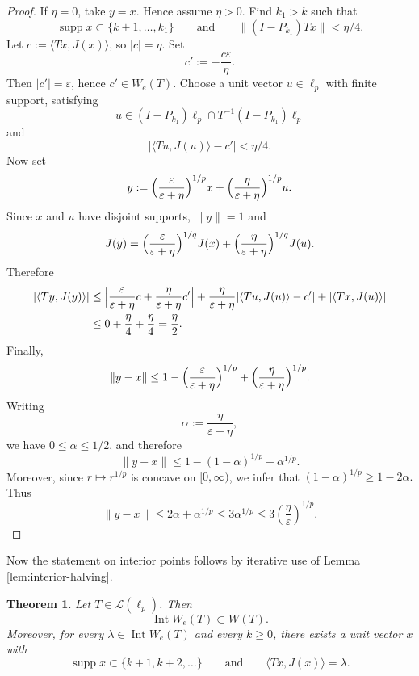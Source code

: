 \documentclass[11pt]{amsart}
\numberwithin{equation}{section}
\newtheorem{theorem}{Theorem}[section]
\theoremstyle{definition}
\theoremstyle{remark}
\DeclareMathOperator{\Int}{Int}
\DeclareMathOperator{\supp}{supp}
\newcommand{\ip}[2]{\langle #1,#2\rangle}
\newcommand{\We}{W_e}
\begin{document}
\begin{proof}
If \(\eta=0\), take \(y=x\). Hence assume \(\eta>0\).
Find $k_1>k$ such that
\[
\supp x\subset \{k+1,\dots,k_1\}
\qquad\text{and}\qquad
\|(I-P_{k_1})Tx\|<\eta/4.
\]
Let $c:=\ip{Tx}{J(x)}$, so $|c|=\eta$. Set
\[
c':=-\frac{c\varepsilon}{\eta}.
\]
Then $|c'|=\varepsilon$, hence $c'\in \We(T)$.
Choose a unit vector $u\in \ell_p$ with finite support, satisfying
\[
u\in (I-P_{k_1})\ell_p\cap T^{-1}(I-P_{k_1})\ell_p
\]
and
\[
|\ip{Tu}{J(u)}-c'|<\eta/4.
\]
Now set
\[
y:=\Bigl(\frac{\varepsilon}{\varepsilon+\eta}\Bigr)^{1/p}x+
\Bigl(\frac{\eta}{\varepsilon+\eta}\Bigr)^{1/p}u.
\]
Since $x$ and $u$ have disjoint supports, $\|y\|=1$ and
\[
J(y)=\Bigl(\frac{\varepsilon}{\varepsilon+\eta}\Bigr)^{1/q}J(x)+
\Bigl(\frac{\eta}{\varepsilon+\eta}\Bigr)^{1/q}J(u).
\]
Therefore
\begin{align*}
|\ip{Ty}{J(y)}|
&\le \Bigl|\frac{\varepsilon}{\varepsilon+\eta}c+\frac{\eta}{\varepsilon+\eta}c'\Bigr|+
\frac{\eta}{\varepsilon+\eta}|\ip{Tu}{J(u)}-c'|+|\ip{Tx}{J(u)}|\\
&\le 0+\frac{\eta}{4}+\frac{\eta}{4}=\frac{\eta}{2}.
\end{align*}
Finally,
\[
\|y-x\|\le 1-\Bigl(\frac{\varepsilon}{\varepsilon+\eta}\Bigr)^{1/p}+\Bigl(\frac{\eta}{\varepsilon+\eta}\Bigr)^{1/p}.
\]
Writing
\[
        \alpha:=\frac{\eta}{\varepsilon+\eta},
\]
we have \(0\le \alpha\le 1/2\), and therefore
\[
        \|y-x\|
        \le 1-(1-\alpha)^{1/p}+\alpha^{1/p}.
\]
Moreover, since \(r\mapsto r^{1/p}\) is concave on \([0,\infty)\), we infer that
\(
        (1-\alpha)^{1/p}\ge 1-2\alpha .
\)
Thus
\[
        \|y-x\|
        \le 2\alpha+\alpha^{1/p}
        \le 3\alpha^{1/p}
        \le 3\left(\frac{\eta}{\varepsilon}\right)^{1/p}.
\]
\end{proof}

Now the statement on interior points follows by iterative use of Lemma \ref{lem:interior-halving}.

\begin{theorem}\label{thm:interior-We-inside-W}
Let $T\in \mathcal L(\ell_p)$. Then
\[
\Int \We(T)\subset W(T).
\]
Moreover, for every $\lambda\in \Int \We(T)$ and every $k\ge 0$, there exists a unit vector $x$ with
\[
\supp x\subset \{k+1,k+2,\dots\}
\qquad\text{and}\qquad
\ip{Tx}{J(x)}=\lambda.
\]
\end{theorem}
\end{document}
